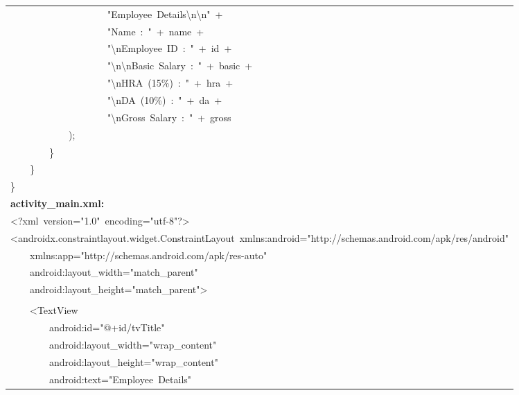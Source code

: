 \documentclass[a4paper,12pt]{article}
\begin{document}
\begin{longtable}{|p{}|}
{\ttfamily\small \ \ \ \ \ \ \ \ \ \ \ \ \ \ \ \ \ \ \ \ "Employee\ Details\textbackslash{}n\textbackslash{}n"\ +} \\
{\ttfamily\small \ \ \ \ \ \ \ \ \ \ \ \ \ \ \ \ \ \ \ \ "Name\ :\ "\ +\ name\ +} \\
{\ttfamily\small \ \ \ \ \ \ \ \ \ \ \ \ \ \ \ \ \ \ \ \ "\textbackslash{}nEmployee\ ID\ :\ "\ +\ id\ +} \\
{\ttfamily\small \ \ \ \ \ \ \ \ \ \ \ \ \ \ \ \ \ \ \ \ "\textbackslash{}n\textbackslash{}nBasic\ Salary\ :\ "\ +\ basic\ +} \\
{\ttfamily\small \ \ \ \ \ \ \ \ \ \ \ \ \ \ \ \ \ \ \ \ "\textbackslash{}nHRA\ (15\%)\ :\ "\ +\ hra\ +} \\
{\ttfamily\small \ \ \ \ \ \ \ \ \ \ \ \ \ \ \ \ \ \ \ \ "\textbackslash{}nDA\ (10\%)\ :\ "\ +\ da\ +} \\
{\ttfamily\small \ \ \ \ \ \ \ \ \ \ \ \ \ \ \ \ \ \ \ \ "\textbackslash{}nGross\ Salary\ :\ "\ +\ gross} \\
{\ttfamily\small \ \ \ \ \ \ \ \ \ \ \ \ );} \\
{\ttfamily\small \ \ \ \ \ \ \ \ \}} \\
{\ttfamily\small \ \ \ \ \}} \\
{\ttfamily\small \}} \\
\hline
\rule{0pt}{13pt}\textbf{activity\_main.xml:} \\
\hline
{\ttfamily\small \textless{}?xml\ version="1.0"\ encoding="utf-8"?\textgreater{}} \\
{\ttfamily\small \textless{}androidx.constraintlayout.widget.ConstraintLayout\ xmlns:android="http://schemas.android.com/apk/res/android"} \\
{\ttfamily\small \ \ \ \ xmlns:app="http://schemas.android.com/apk/res-auto"} \\
{\ttfamily\small \ \ \ \ android:layout\_width="match\_parent"} \\
{\ttfamily\small \ \ \ \ android:layout\_height="match\_parent"\textgreater{}} \\
\strut \\
{\ttfamily\small \ \ \ \ \textless{}TextView} \\
{\ttfamily\small \ \ \ \ \ \ \ \ android:id="@+id/tvTitle"} \\
{\ttfamily\small \ \ \ \ \ \ \ \ android:layout\_width="wrap\_content"} \\
{\ttfamily\small \ \ \ \ \ \ \ \ android:layout\_height="wrap\_content"} \\
{\ttfamily\small \ \ \ \ \ \ \ \ android:text="Employee\ Details"} \\

\end{longtable}
\end{document}
